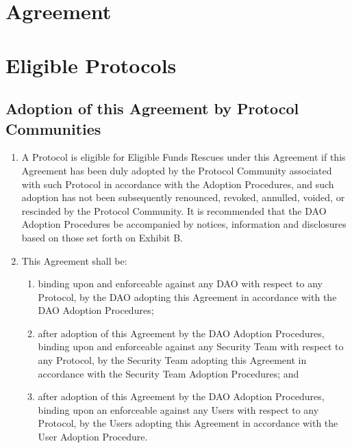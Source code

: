\documentclass{article}
\begin{document}
\section*{Agreement}\label{sec:agreement}

\section{Eligible Protocols}\label{sec:eligible}

\subsection{Adoption of this Agreement by Protocol Communities}\label{subsec:adoption}

\begin{enumerate}
    \item A Protocol is eligible for Eligible Funds Rescues under this Agreement if this Agreement has been duly adopted by the Protocol Community associated with such Protocol in accordance with the Adoption Procedures, and such adoption has not been subsequently renounced, revoked, annulled, voided, or rescinded by the Protocol Community. It is recommended that the DAO Adoption Procedures be accompanied by notices, information and disclosures based on those set forth on Exhibit B.

    \item This Agreement shall be:

          \begin{enumerate}
              \item binding upon and enforceable against any DAO with respect to any Protocol, by the DAO adopting this Agreement in accordance with the DAO Adoption Procedures;

              \item after adoption of this Agreement by the DAO Adoption Procedures, binding upon and enforceable against any Security Team with respect to any Protocol, by the Security Team adopting this Agreement in accordance with the Security Team Adoption Procedures; and

              \item after adoption of this Agreement by the DAO Adoption Procedures, binding upon an enforceable against any Users with respect to any Protocol, by the Users adopting this Agreement in accordance with the User Adoption Procedure.

          \end{enumerate}


\end{enumerate}
\end{document}
